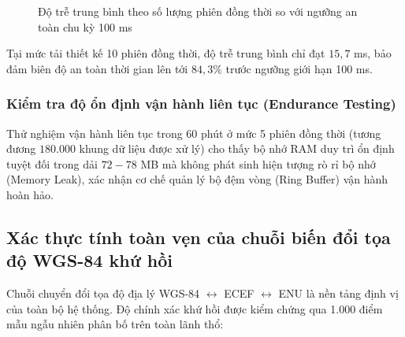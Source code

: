 \begin{figure}[H]
\centering
{}
\caption{Độ trễ trung bình theo số lượng phiên đồng thời so với ngưỡng an toàn chu kỳ 100 ms}
\label{fig:load-test-latency-curve}
\end{figure}

Tại mức tải thiết kế 10 phiên đồng thời, độ trễ trung bình chỉ đạt $15{,}7$ ms, bảo đảm biên độ an toàn thời gian lên tới $84{,}3\%$ trước ngưỡng giới hạn 100 ms.

\subsubsection{Kiểm tra độ ổn định vận hành liên tục (Endurance Testing)}

\hspace{0.5cm} Thử nghiệm vận hành liên tục trong 60 phút ở mức 5 phiên đồng thời (tương đương $180.000$ khung dữ liệu được xử lý) cho thấy bộ nhớ RAM duy trì ổn định tuyệt đối trong dải $72 - 78$ MB mà không phát sinh hiện tượng rò rỉ bộ nhớ (Memory Leak), xác nhận cơ chế quản lý bộ đệm vòng (Ring Buffer) vận hành hoàn hảo.

\subsection{Xác thực tính toàn vẹn của chuỗi biến đổi tọa độ WGS-84 khứ hồi}

\hspace{0.5cm} Chuỗi chuyển đổi tọa độ địa lý WGS-84 $\leftrightarrow$ ECEF $\leftrightarrow$ ENU là nền tảng định vị của toàn bộ hệ thống. Độ chính xác khứ hồi được kiểm chứng qua 1.000 điểm mẫu ngẫu nhiên phân bố trên toàn lãnh thổ:

